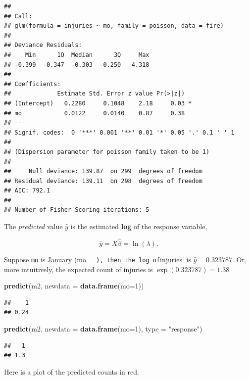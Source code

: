 \documentclass[
]{book}
\newenvironment{Shaded}{\begin{snugshade}}{\end{snugshade}}
\newcommand{\DataTypeTok}[1]{\textcolor[rgb]{0.13,0.29,0.53}{#1}}
\newcommand{\DecValTok}[1]{\textcolor[rgb]{0.00,0.00,0.81}{#1}}
\newcommand{\KeywordTok}[1]{\textcolor[rgb]{0.13,0.29,0.53}{\textbf{#1}}}
\newcommand{\NormalTok}[1]{#1}
\newcommand{\StringTok}[1]{\textcolor[rgb]{0.31,0.60,0.02}{#1}}
\begin{document}
\begin{verbatim}
## 
## Call:
## glm(formula = injuries ~ mo, family = poisson, data = fire)
## 
## Deviance Residuals: 
##    Min      1Q  Median      3Q     Max  
## -0.399  -0.347  -0.303  -0.250   4.318  
## 
## Coefficients:
##             Estimate Std. Error z value Pr(>|z|)  
## (Intercept)   0.2280     0.1048    2.18     0.03 *
## mo            0.0122     0.0140    0.87     0.38  
## ---
## Signif. codes:  0 '***' 0.001 '**' 0.01 '*' 0.05 '.' 0.1 ' ' 1
## 
## (Dispersion parameter for poisson family taken to be 1)
## 
##     Null deviance: 139.87  on 299  degrees of freedom
## Residual deviance: 139.11  on 298  degrees of freedom
## AIC: 792.1
## 
## Number of Fisher Scoring iterations: 5
\end{verbatim}

The \emph{predicted} value \(\hat{y}\) is the estimated \textbf{log} of the response variable,

\[\hat{y} = X \hat{\beta} = \ln (\lambda).\]

Suppose \texttt{mo} is January (mo = \texttt{),\ then\ the\ log\ of}injuries` is \(\hat{y} = 0.323787\). Or, more intuitively, the expected count of injuries is \(\exp(0.323787) = 1.38\)

\begin{Shaded}
\begin{Highlighting}[]
\KeywordTok{predict}\NormalTok{(m2, }\DataTypeTok{newdata =} \KeywordTok{data.frame}\NormalTok{(}\DataTypeTok{mo=}\DecValTok{1}\NormalTok{))}
\end{Highlighting}
\end{Shaded}

\begin{verbatim}
##    1 
## 0.24
\end{verbatim}

\begin{Shaded}
\begin{Highlighting}[]
\KeywordTok{predict}\NormalTok{(m2, }\DataTypeTok{newdata =} \KeywordTok{data.frame}\NormalTok{(}\DataTypeTok{mo=}\DecValTok{1}\NormalTok{), }\DataTypeTok{type =} \StringTok{"response"}\NormalTok{)}
\end{Highlighting}
\end{Shaded}

\begin{verbatim}
##   1 
## 1.3
\end{verbatim}

Here is a plot of the predicted counts in red.
\end{document}
